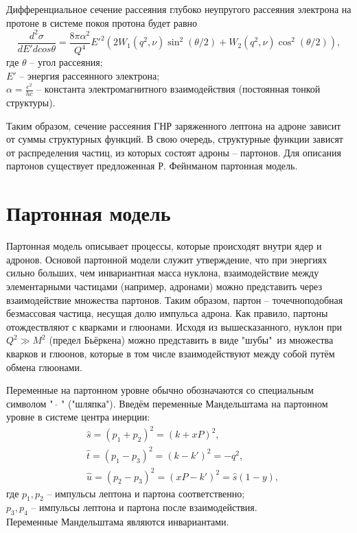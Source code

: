 \documentclass{extreport}
\begin{document}
Дифференциальное сечение рассеяния глубоко неупругого рассеяния электрона на протоне в системе покоя протона будет равно
\begin{equation}
	\frac{d^2\sigma}{dE' d cos\theta} = \frac{8\pi \alpha^2}{Q^4} E'^2 (2W_1(q^2, \nu) \sin^2 (\theta /2) + W_2 (q^2, \nu) \cos^2 (\theta/2)),
\end{equation}
где $\theta$ -- угол рассеяния; \\ $E'$ -- энергия рассеянного электрона; \\ $\alpha = \frac{e^2}{hc}$ -- константа электромагнитного взаимодействия (постоянная тонкой структуры).

Таким образом, сечение рассеяния ГНР заряженного лептона на адроне зависит от суммы структурных функций. В свою очередь, структурные функции зависят от распределения частиц, из которых состоят адроны -- партонов. Для описания партонов существует предложенная Р. Фейнманом партонная модель.
 
\newpage
\chapter{Партонная модель}
Партонная модель описывает процессы, которые происходят внутри ядер и адронов. Основой партонной модели служит утверждение, что при энергиях сильно больших, чем инвариантная масса нуклона, взаимодействие между элементарными частицами (например, адронами) можно представить через взаимодействие множества партонов. Таким образом, партон -- точечноподобная безмассовая частица, несущая долю импульса адрона. Как правило, партоны отождествляют с кварками и глюонами. 
Исходя из вышесказанного, нуклон при $Q^2 \gg M^2$ (предел Бьёркена) можно представить в виде "шубы"\ из множества кварков и глюонов, которые в том числе взаимодействуют между собой путём обмена глюонами.


Переменные на партонном уровне обычно обозначаются со специальным символом "\ $\hat{}$ " ("шляпка"). Введём переменные Мандельштама на партонном уровне в системе центра инерции:
\begin{equation}
\begin{split}
	& \hat{s} = (p_1+p_2)^2 = (k + xP)^2, \\
	& \hat{t} = (p_1-p_3)^2 = (k-k')^2 = -q^2, \\
	& \hat{u} = (p_2-p_3)^2 =(xP-k')^2= \hat{s} (1-y),
\end{split}
\end{equation}
где $p_1, p_2$ -- импульсы лептона и партона соответственно; \\ $p_3, p_4$ -- импульсы лептона и партона после взаимодействия. \\
Переменные Мандельштама являются инвариантами. 
\end{document}
